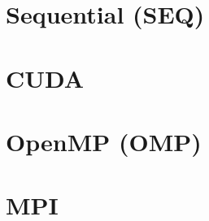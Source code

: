 \documentclass{article}
\begin{document}
\section*{Sequential (SEQ)}

\medskip

\medskip

\medskip

\clearpage
\section*{CUDA}


\medskip

\medskip

\medskip

\medskip

\clearpage
\section*{OpenMP (OMP)}


\medskip

\medskip

\medskip

\clearpage
\section*{MPI}


\medskip

\medskip

\medskip
\end{document}
